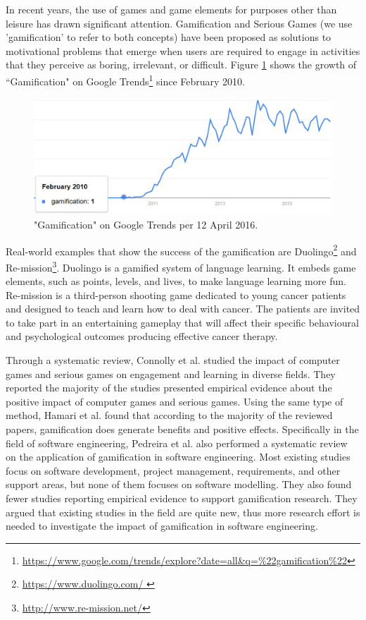 \documentclass[12pt, a4paper]{report}
\begin{document}
In recent years, the use of games and game elements for purposes other than leisure has drawn significant attention. Gamification \cite{deterding2011game} and Serious Games \cite{Michael2005} (we use 'gamification' to refer to both concepts) have been proposed as solutions to motivational problems that emerge when users are required to engage in activities that they perceive as boring, irrelevant, or difficult. Figure \ref{gamification-trend} shows the growth of ``Gamification" on Google Trends\footnote{\url{https://www.google.com/trends/explore?date=all&q=\%22gamification\%22}} since February 2010. 

\begin{figure}[ht]
\centering
\includegraphics[width=12cm]{gamification-trend}
\caption{"Gamification" on Google Trends per 12 April 2016.}
\label{gamification-trend}
\end{figure}

Real-world examples that show the success of the gamification are Duolingo\footnote{\url{https://www.duolingo.com/
}} and Re-mission\footnote{\url{http://www.re-mission.net/}}. Duolingo is a gamified system of language learning. It embeds game elements, such as points, levels, and lives, to make language learning more fun. Re-mission is a third-person shooting game dedicated to young cancer patients and designed to teach and learn how to deal with cancer. The patients are invited to take part in an entertaining gameplay that will affect their specific behavioural and psychological outcomes producing effective cancer therapy.
 
Through a systematic review, Connolly et al. \cite{connolly2012systematic} studied the impact of computer games and serious games on engagement and learning in diverse fields. They reported the majority of the studies presented empirical evidence about the positive impact of computer games and serious games. Using the same type of method, Hamari et al. \cite{hamari2014does} found that according to the majority of the reviewed papers, gamification does generate benefits and positive effects. Specifically in the field of software engineering, Pedreira et al. \cite{Pedreira2015} also performed a systematic review on the application of gamification in software engineering. Most existing studies focus on software development, project management, requirements, and other support areas, but none of them focuses on software modelling. They also found fewer studies reporting empirical evidence to support gamification research. They argued that existing studies in the field are quite new, thus more research effort is needed to investigate the impact of gamiﬁcation in software engineering. 
\end{document}
